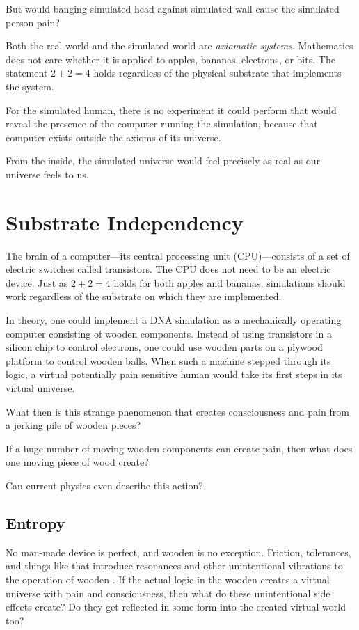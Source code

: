 But would banging simulated head against simulated wall cause the simulated person pain? 

Both the real world and the simulated world are \emph{axiomatic systems}. Mathematics does 
not care whether it is applied to apples, bananas, electrons, or bits. The statement $2 + 2 = 4$ holds 
regardless of the physical substrate that implements the system.

For the simulated human, there is no experiment it could perform that would reveal the presence of the computer 
running the simulation, because that computer exists outside the axioms of its universe.

From the inside, the simulated universe would feel precisely as real as our universe feels to us.


\section{Substrate Independency}

The brain of a computer---its central processing unit (CPU)---consists of a set of electric switches called transistors. The CPU does not need to be an electric device.
Just as $2+2=4$ holds for both apples and bananas, simulations should work regardless of the substrate on which they are implemented.

In theory, one could implement a DNA simulation as a mechanically operating computer consisting of wooden components. Instead of using transistors in a silicon chip to control electrons, one could use wooden parts on a plywood platform to control wooden balls. When such a machine stepped through its logic, a virtual potentially pain sensitive
human would take its first steps in its virtual universe.

What then is this strange phenomenon that creates consciousness and pain from a jerking pile of wooden pieces?

If a huge number of moving wooden components can create pain, then what does one moving piece of wood create?

Can current physics even describe this action?

\subsection*{Entropy}

No man-made device is perfect, and wooden \texttrademark{} is no exception. Friction, tolerances, and things like that introduce resonances and other unintentional vibrations to the operation of wooden \texttrademark{}.
If the actual logic in the wooden \texttrademark{} creates a virtual universe with pain and consciousness, then what do these unintentional side effects create? Do they get reflected in some form into the created virtual world too?

